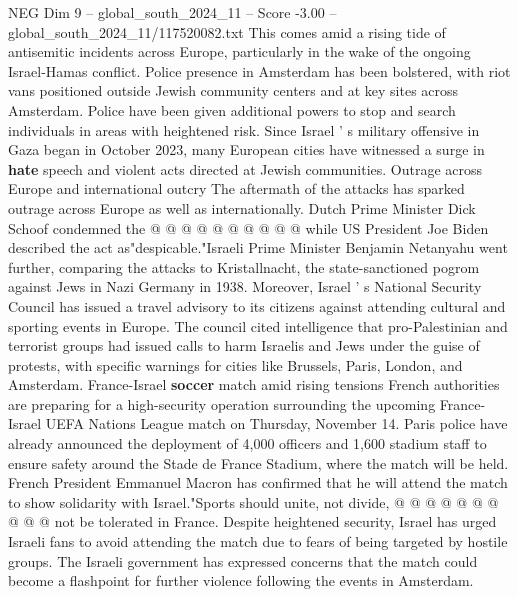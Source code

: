 \begin{textsample}{NEG Dim 9 – global\_south\_2024\_11 – Score -3.00 – global\_south\_2024\_11/117520082.txt}
This comes amid a rising tide of antisemitic incidents across Europe, particularly in the wake of the ongoing Israel-Hamas conflict.
Police presence in Amsterdam has been bolstered, with riot vans positioned outside Jewish community centers and at key sites across Amsterdam.
Police have been given additional powers to stop and search individuals in areas with heightened risk.
Since Israel ' s military offensive in Gaza began in October 2023, many European cities have witnessed a surge in \textbf{hate} speech and violent acts directed at Jewish communities.
Outrage across Europe and international outcry The aftermath of the attacks has sparked outrage across Europe as well as internationally.
Dutch Prime Minister Dick Schoof condemned the @ @ @ @ @ @ @ @ @ @ while US President Joe Biden described the act as"despicable."Israeli Prime Minister Benjamin Netanyahu went further, comparing the attacks to Kristallnacht, the state-sanctioned pogrom against Jews in Nazi Germany in 1938.
Moreover, Israel ' s National Security Council has issued a travel advisory to its citizens against attending cultural and sporting events in Europe.
The council cited intelligence that pro-Palestinian and terrorist groups had issued calls to harm Israelis and Jews under the guise of protests, with specific warnings for cities like Brussels, Paris, London, and Amsterdam.
France-Israel \textbf{soccer} match amid rising tensions French authorities are preparing for a high-security operation surrounding the upcoming France-Israel UEFA Nations League match on Thursday, November 14.
Paris police have already announced the deployment of 4,000 officers and 1,600 stadium staff to ensure safety around the Stade de France Stadium, where the match will be held.
French President Emmanuel Macron has confirmed that he will attend the match to show solidarity with Israel."Sports should unite, not divide, @ @ @ @ @ @ @ @ @ @ not be tolerated in France.
Despite heightened security, Israel has urged Israeli fans to avoid attending the match due to fears of being targeted by hostile groups.
The Israeli government has expressed concerns that the match could become a flashpoint for further violence following the events in Amsterdam.

\end{textsample}
